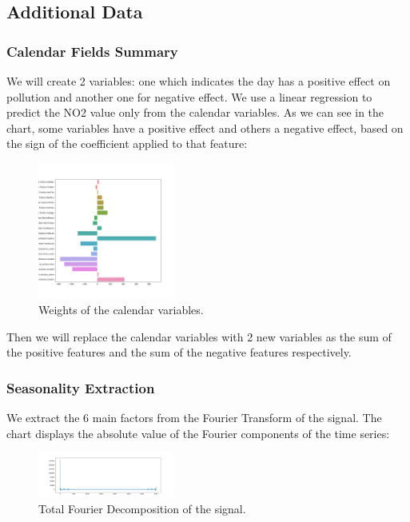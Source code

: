 \documentclass[a4paper,twocolumn,5p]{elsarticle}
\begin{document}
\subsection{Additional Data}
\label{sec:additional_data}

\subsubsection{Calendar Fields Summary}

We will create 2 variables: one which indicates the day has a positive effect on pollution and 
another one for negative effect. We use a linear regression to predict the NO2 value only from the calendar variables.
As we can see in the chart, some variables have a positive effect and others a negative effect, based on the
sign of the coefficient applied to that feature:

\begin{figure}
  \caption{Weights of the calendar variables.}
  \centering
  \includegraphics[width=0.4\textwidth]{calweights}
\end{figure}

Then we will replace the calendar variables with 2 new variables as the sum of the positive 
features and the sum of the negative features respectively.

\subsubsection{Seasonality Extraction}

We extract the 6 main factors from the Fourier Transform of the signal. The chart displays the absolute value of
the Fourier components of the time series:

\begin{figure}
  \caption{Total Fourier Decomposition of the signal.}
  \centering
  \includegraphics[width=0.4\textwidth]{decomposition}
\end{figure}
\end{document}
